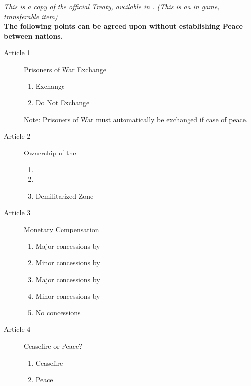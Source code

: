\documentclass[white]{NeptuneBall}
\begin{document}
\name{\wTreaty{}}

\emph{This is a copy of the official Treaty, available in \pBanquet{}. (This is an in game, transferable item)}\\

{\bf The following points can be agreed upon without establishing Peace between nations.}

\begin{description}
\item[Article 1] Prisoners of War Exchange
	\begin{multicols}{2}
  \begin{enumerate}
  \item Exchange
  \item Do Not Exchange
  \end{enumerate}
	\end{multicols}
Note: Prisoners of War must automatically be exchanged if case of peace.
\item[Article 2] Ownership of the \pGazaStrip{}
	\begin{multicols}{3}
  \begin{enumerate}
  \item \pAtlantis{}
  \item \pPacifica{}
  \item Demilitarized Zone
  \end{enumerate}
  \end{multicols}
\item[Article 3] Monetary Compensation
  \begin{multicols}{3}
  \begin{enumerate}
  \item Major concessions by \pAtlantis{}
  \item Minor concessions by \pAtlantis{}
  \item Major concessions by \pPacifica{}
  \item Minor concessions by \pPacifica{}
  \item No concessions
  \end{enumerate}
	\end{multicols}
\item[Article 4] Ceasefire or Peace?
	\begin{multicols}{2}
  \begin{enumerate}
  \item Ceasefire
  \item Peace
	\end{enumerate}
  \end{multicols}
\end{description}
\end{document}
